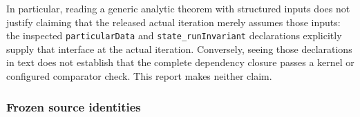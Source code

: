 \documentclass[10pt,a4paper]{article}
\begin{document}
In particular, reading a generic analytic theorem with structured inputs does not justify claiming that the released actual iteration merely assumes those inputs: the inspected \texttt{particularData} and \texttt{s\allowbreak{}t\allowbreak{}a\allowbreak{}t\allowbreak{}e\allowbreak{}\_\allowbreak{}r\allowbreak{}u\allowbreak{}n\allowbreak{}I\allowbreak{}n\allowbreak{}v\allowbreak{}a\allowbreak{}r\allowbreak{}i\allowbreak{}a\allowbreak{}n\allowbreak{}t} declarations explicitly supply that interface at the actual iteration. Conversely, seeing those declarations in text does not establish that the complete dependency closure passes a kernel or configured comparator check. This report makes neither claim.

\subsubsection{Frozen source identities}\label{nsupstream:stage_cycle_gain_audit:frozen-source-identities}
\end{document}
